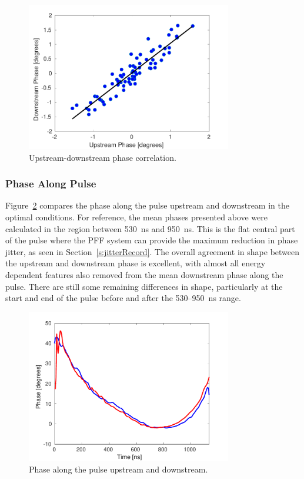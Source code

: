 \begin{figure}
  \centering
  \includegraphics[width=0.8\textwidth]{Figures/propagation/bestProp_meanCorr}
  \caption{Upstream-downstream phase correlation.}
  \label{f:bestProp_meanCorr}
\end{figure}

\subsubsection{Phase Along Pulse}

Figure~\ref{f:bestProp_meanAlong} compares the phase along the pulse upstream and downstream in the optimal conditions. For reference, the mean phases presented above were calculated in the region between 530~ns and 950~ns. This is the flat central part of the pulse where the PFF system can provide the maximum reduction in phase jitter, as seen in Section~\ref{s:jitterRecord}. The overall agreement in shape between the upstream and downstream phase is excellent, with almost all energy dependent features also removed from the mean downstream phase along the pulse. There are still some remaining differences in shape, particularly at the start and end of the pulse before and after the 530--950~ns range.

\begin{figure}
  \centering
  \includegraphics[width=0.8\textwidth]{Figures/propagation/bestProp_meanAlong}
  \caption{Phase along the pulse upstream and downstream.}
  \label{f:bestProp_meanAlong}
\end{figure}

